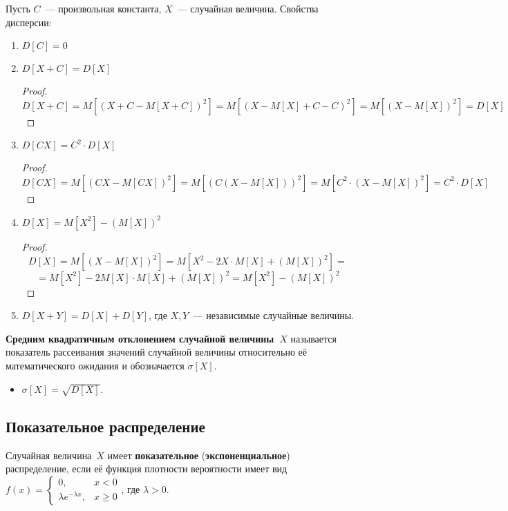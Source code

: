 Пусть $C$~--- произвольная константа, $X$~--- случайная величина.
Свойства дисперсии:
\begin{enumerate}
	\item $D[C] = 0$
	
	\item $D[X + C] = D[X]$
	\begin{proof}
	\begin{equation*}
	D[X + C] =
	M\left[(X + C - M[X + C])^2\right] =
	M\left[(X - M[X] + C - C)^2\right] =
	M\left[(X - M[X])^2\right] =
	D[X]
	\end{equation*}
	\end{proof}
	
	\item $D[CX] = C^2 \cdot D[X]$
	\begin{proof}
	\begin{equation*}
	D[CX] =
	M\left[(CX - M[CX])^2\right] =
	M\left[(C(X - M[X]))^2\right] =
	M\left[C^2 \cdot (X - M[X])^2\right] =
	C^2 \cdot D[X]
	\end{equation*}
	\end{proof}
	
	\item $D[X] = M[X^2] - (M[X])^2$
	\begin{proof}
	\begin{equation*}
	D[X] =
	M\left[(X - M[X])^2\right] =
	M\left[X^2 - 2X \cdot M[X] + (M[X])^2\right] =
	\end{equation*}
	\begin{equation*}
	= M\left[X^2\right] - 2M[X] \cdot M[X] + (M[X])^2 =
	M\left[X^2\right] - (M[X])^2
	\end{equation*}
	\end{proof}
	
	\item $D[X + Y] = D[X] + D[Y]$, где $X, Y$~--- независимые случайные величины.
\end{enumerate}

 \textbf{Средним квадратичным отклонением случайной величины~$X$} называется показатель рассеивания значений случайной величины относительно её математического ожидания и обозначается $\sigma[X]$.
\begin{itemize}
	\item $\displaystyle \sigma[X] = \sqrt{D[X]}$.
\end{itemize}

\subsection{Показательное распределение}
  Случайная величина~$X$ имеет \textbf{показательное} (\textbf{экспоненциальное}) распределение, если её функция плотности вероятности имеет вид~$f(x) =
\begin{cases}
0, & x < 0 \\
\lambda e^{-\lambda x}, & x \geqslant 0
\end{cases}$,
где $\lambda > 0$.

